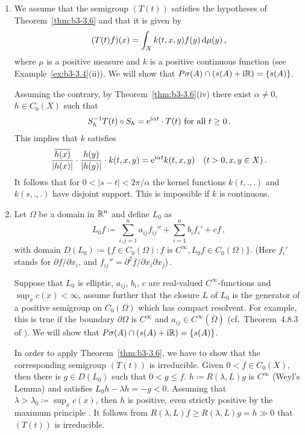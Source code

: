 \begin{examples}\label{ex:b3-3.10}
%
	
	\begin{enumerate}[\upshape (i), wide, labelindent=.5em] 
	\item 
	We assume that the semigroup $(T(t))$ satisfies the hypotheses of Theorem~\ref{thm:b3-3.6} and that it is given by
	\[
	(T(t)f)(x) = \int_{X} k(t,x,y)f(y) \mathop{}\!\mathrm{d}{\mu}(y)\,,
	\]
	where $\mu$ is a positive measure and $k$ is a positive continuous function (see Example~\ref{ex:b3-3.4}(ii)).
	We will show that $P\sigma(A)\cap(s(A) + \mathrm{i}\mathbb{R}) = \{s(A)\}$.
	
	Assuming the contrary, by Theorem~\ref{thm:b3-3.6}(iv) there exist $\alpha \neq 0$, $h \in C_{0}(X)$ such that
	\begin{equation}\label{eq:b3-3.10}
	S_{h}^{-1}T(t)\circ S_{h} = \mathrm{e}^{\mathrm{i}\alpha t}\cdot T(t) \text{ for all } t \geq 0\,.
	\end{equation}
	This implies that $k$ satisfies
	\begin{equation}\label{eq:b3-3.11}
	\frac{\overline{h(x)}}{|h(x)|}\cdot\frac{h(y)}{|h(y)|}\cdot k(t,x,y) = \mathrm{e}^{\mathrm{i}\alpha t}k(t,x,y) \quad (t > 0, x,y \in X)\,.
	\end{equation}
	It follows that for $0 < |s-t| < 2\pi/\alpha$ the kernel functions  $k(t,.,.)$ and $k(s,.,.)$ have disjoint support.
	This is impossible if $k$ is continuous.
	
	\item 
	Let $\Omega$ be a domain in $\mathbb{R}^{n}$ and define $L_{0}$ as
	\[
	L_{0}f \coloneq \sum_{i,j=1}^{n} a_{ij}f_{ij}'' + \sum_{i=1}^{n}b_{i}f_{i}' + cf\,,
	\]
	with domain $D(L_{0}) \coloneq \{f \in C_{0}(\Omega) : f \text{ is } C^{\infty}, L_{0}f \in C_{0}(\Omega)\}$.
	(Here $f_{i}'$ stands for $\partial f/\partial x_{i}$, and $f_{ij}'' = \partial^{2}f/\partial x_{i}\partial x_{j}$)\,.
	
	Suppose that $L_{0}$ is elliptic, $a_{ij}$, $b_{i}$, $c$ are real-valued $C^{\infty}$-functions and $\sup_x c(x) < \infty$, assume further that the closure $L$ of $L_{0}$ is the generator of a positive semigroup on $C_{0}(\Omega)$ which has compact resolvent.
	For example, this is true if the boundary  $\partial\Omega$ is $C^{\infty}$ and $a_{ij} \in C^{\infty}(\overline{\Omega})$ (cf.\ Theorem~4.8.3 of \citet{fattorini:1983}).
	We will show that $P\sigma(A)\cap(s(A) + \mathrm{i}\mathbb{R}) = \{s(A)\}$.
	
	In order to apply Theorem~\ref{thm:b3-3.6}, we have to show that the corresponding semigroup $(T(t))$ is irreducible.
	Given $0 < f \in C_{0}(X)$, then there is $g \in D(L_{0})$ such that $0 < g \leq f$.
	$h \coloneq R(\lambda,L)g$ is $C^{\infty}$ (Weyl's Lemma) and satisfies $L_{0}h - \lambda h = -g < 0$.
	Assuming that $\lambda > \lambda_{0} \coloneqq \sup_x c(x)$, then $h$ is positive, even strictly positive by the maximum principle \citet[Chapter~2, Theorem~6]{protterweinberger:1967}.
	It follows from $R(\lambda,L)f \geq R(\lambda,L)g = h \gg 0$ that $(T(t))$ is irreducible.
	

\end{enumerate}
\end{examples}
